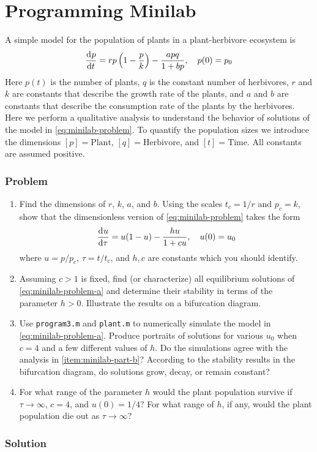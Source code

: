 \documentclass[12pt]{article}
\begin{document}
\section{Programming Minilab}
A simple model for the population of plants in a plant-herbivore ecosystem is
\begin{equation}
  \label{eq:minilab-problem}
  \frac{\mathrm{d}^{} {p}}{\mathrm{d}{t}^{}} = rp\left( 1-\frac{p}{k} \right) - \frac{apq}{1+bp}, \quad p(0)=p_0
\end{equation}
Here $p(t)$ is the number of plants, $q$ is the constant number of herbivores,
$r$ and $k$ are constants that describe the growth rate of the plants, and $a$
and $b$ are constants that describe the consumption rate of the plants by the
herbivores. Here we perform a qualitative analysis to understand the behavior of
solutions of the model in \cref{eq:minilab-problem}. To quantify the population
sizes we introduce the dimensions $[p] = \text{Plant}$, $[q] =
\text{Herbivore}$, and $[t] = \text{Time}$. All constants are assumed positive.

\subsubsection*{Problem}
\begin{enumerate}
\item Find the dimensions of $r$, $k$, $a$, and $b$. Using the scales $t_c =
  1/r$ and $p_c = k$, show that the dimensionless version of
  \cref{eq:minilab-problem} takes the form
  \begin{equation}
    \label{eq:minilab-problem-a}
    \frac{\mathrm{d}^{} {u}}{\mathrm{d}{\tau}^{}}=u(1-u)-\frac{hu}{1+cu},\quad u(0)=u_0
  \end{equation}
  where $u=p/p_c$, $\tau=t/t_c$, and $h,c$ are constants which you should
  identify.
\item Assuming $c>1$ is fixed, find (or characterize) all equilibrium solutions
  of \cref{eq:minilab-problem-a} and determine their stability in terms of the
  parameter $h>0$. Illustrate the results on a bifurcation diagram.
\label{item:minilab-part-b}
\item Use \verb|program3.m| and \verb|plant.m| to numerically simulate the model
  in \cref{eq:minilab-problem-a}. Produce portraits of solutions for various
  $u_0$ when $c=4$ and a few different values of $h$. Do the simulations agree
  with the analysis in \cref{item:minilab-part-b}? According to the stability
  results in the bifurcation diagram, do solutions grow, decay, or remain
  constant?
\item For what range of the parameter $h$ would the plant population survive if
  $\tau\rightarrow\infty$, $c=4$, and $u(0)=1/4$? For what range of $h$, if any,
  would the plant population die out as $\tau\rightarrow\infty$?
\end{enumerate}

\subsubsection*{Solution}
\todo[]
\end{document}
